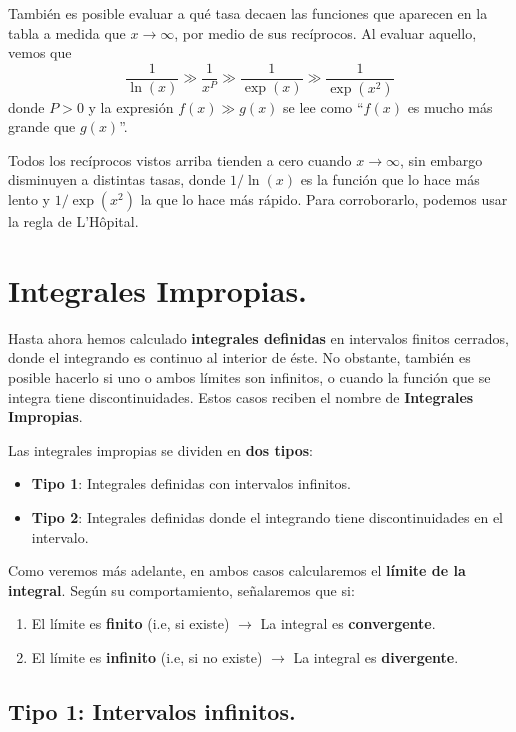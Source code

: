 \documentclass[12pt]{article}
\begin{document}
También es posible evaluar a qué tasa decaen las funciones que aparecen en la tabla a medida que $x \to \infty$, por medio de sus recíprocos. Al evaluar aquello, vemos que
\[
  \frac{1}{\ln(x)} \gg \frac{1}{x^{P}} \gg \frac{1}{\exp(x)} \gg \frac{1}{\exp(x^{2})}
\]
donde $P > 0$ y la expresión $f(x) \gg g(x)$ se lee como ``$f(x)$ es mucho más grande que $g(x)$''.

Todos los recíprocos vistos arriba tienden a cero cuando $x \to \infty$, sin embargo disminuyen a distintas tasas, donde $1/\ln(x)$ es la función que lo hace más lento y $1/\exp(x^{2})$ la que lo hace más rápido. Para corroborarlo, podemos usar la regla de L'Hôpital.


\section{Integrales Impropias.}

Hasta ahora hemos calculado \textbf{integrales definidas} en intervalos finitos cerrados, donde el integrando es continuo al interior de éste. No obstante, también es posible hacerlo si uno o ambos límites son infinitos, o cuando la función que se integra tiene discontinuidades. Estos casos reciben el nombre de \textbf{Integrales Impropias}.

Las integrales impropias se dividen en \textbf{dos tipos}:

\begin{itemize}
\item \textbf{Tipo 1}: Integrales definidas con intervalos infinitos.
\item \textbf{Tipo 2}: Integrales definidas donde el integrando tiene discontinuidades en el intervalo.
\end{itemize}

Como veremos más adelante, en ambos casos calcularemos el \textbf{límite de la integral}. Según su comportamiento, señalaremos que si:

\begin{enumerate}
\item El límite es \textbf{finito} (i.e, si existe) $\rightarrow$ La integral es \textbf{convergente}.
\item El límite es \textbf{infinito} (i.e, si no existe) $\rightarrow$ La integral es \textbf{divergente}.
\end{enumerate}

\subsection{Tipo 1: Intervalos infinitos.}
\end{document}

